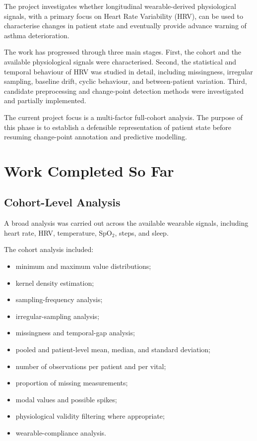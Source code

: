 \documentclass[11pt,a4paper]{article}
\begin{document}
The project investigates whether longitudinal wearable-derived physiological
signals, with a primary focus on Heart Rate Variability (HRV), can be used to
characterise changes in patient state and eventually provide advance warning
of asthma deterioration.

The work has progressed through three main stages. First, the cohort and the
available physiological signals were characterised. Second, the statistical
and temporal behaviour of HRV was studied in detail, including missingness,
irregular sampling, baseline drift, cyclic behaviour, and between-patient
variation. Third, candidate preprocessing and change-point detection methods
were investigated and partially implemented.

The current project focus is a multi-factor full-cohort analysis. The purpose
of this phase is to establish a defensible representation of patient state
before resuming change-point annotation and predictive modelling.

\section{Work Completed So Far}

\subsection{Cohort-Level Analysis}

A broad analysis was carried out across the available wearable signals,
including heart rate, HRV, temperature, SpO$_2$, steps, and sleep.

The cohort analysis included:

\begin{itemize}[leftmargin=1.5em]
    \item minimum and maximum value distributions;
    \item kernel density estimation;
    \item sampling-frequency analysis;
    \item irregular-sampling analysis;
    \item missingness and temporal-gap analysis;
    \item pooled and patient-level mean, median, and standard deviation;
    \item number of observations per patient and per vital;
    \item proportion of missing measurements;
    \item modal values and possible spikes;
    \item physiological validity filtering where appropriate;
    \item wearable-compliance analysis.
\end{itemize}
\end{document}
